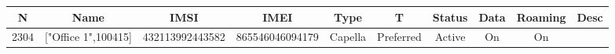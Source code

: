 \begin{longtable*}{|c|c|c|c|c|c|c|c|c|c|}\hline
{}
N&Name&IMSI&IMEI&Type&T&Status&Data&Roaming&Desc\\\hline\hline
{}2304&["Office 1",100415]&432113992443582&865546046094179&Capella&Preferred&Active&On&On&\\\hline
\end{longtable*}

